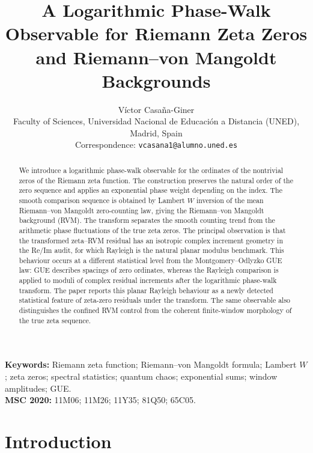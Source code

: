 \documentclass[12pt]{article}
\title{A Logarithmic Phase-Walk Observable for Riemann Zeta Zeros and Riemann--von Mangoldt Backgrounds}
\author{V\'ictor Casa\~na-Giner\\
\small Faculty of Sciences, Universidad Nacional de Educaci\'on a Distancia (UNED), Madrid, Spain\\
\small Correspondence: \texttt{vcasana1@alumno.uned.es}}
\date{}
\numberwithin{equation}{section}
\begin{document}
\maketitle

\begin{abstract}
We introduce a logarithmic phase-walk observable for the ordinates of the nontrivial zeros of the Riemann zeta function. The construction preserves the natural order of the zero sequence and applies an exponential phase weight depending on the index. The smooth comparison sequence is obtained by Lambert \(W\) inversion of the mean Riemann--von Mangoldt zero-counting law, giving the Riemann--von Mangoldt background (RVM). The transform separates the smooth counting trend from the arithmetic phase fluctuations of the true zeta zeros. The principal observation is that the transformed zeta--RVM residual has an isotropic complex increment geometry in the Re/Im audit, for which Rayleigh is the natural planar modulus benchmark. This behaviour occurs at a different statistical level from the Montgomery--Odlyzko GUE law: GUE describes spacings of zero ordinates, whereas the Rayleigh comparison is applied to moduli of complex residual increments after the logarithmic phase-walk transform. The paper reports this planar Rayleigh behaviour as a newly detected statistical feature of zeta-zero residuals under the transform. The same observable also distinguishes the confined RVM control from the coherent finite-window morphology of the true zeta sequence.
\end{abstract}

\noindent\textbf{Keywords:} Riemann zeta function; Riemann--von Mangoldt formula; Lambert \(W\); zeta zeros; spectral statistics; quantum chaos; exponential sums; window amplitudes; GUE.\\[0.2cm]
\noindent\textbf{MSC 2020:} 11M06; 11M26; 11Y35; 81Q50; 65C05.

\linenumbers
\section{Introduction}
\label{sec:introduction}
\end{document}
